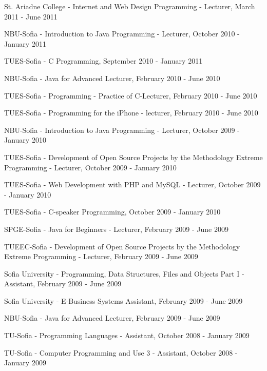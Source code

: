 \documentclass[english,a4paper]{europasscv}
\begin{document}
\begin{europasscv}
{\begin{ecvitemize}
    \item St. Ariadne College - Internet and Web Design Programming - Lecturer, March 2011 - June 2011
    \item NBU-Sofia - Introduction to Java Programming - Lecturer, October 2010 - January 2011
    \item TUES-Sofia - C Programming, September 2010 - January 2011
    \item NBU-Sofia - Java for Advanced Lecturer, February 2010 - June 2010
    \item TUES-Sofia - Programming - Practice of C-Lecturer, February 2010 - June 2010
    \item TUES-Sofia - Programming for the iPhone - lecturer, February 2010 - June 2010
    \item NBU-Sofia - Introduction to Java Programming - Lecturer, October 2009 - January 2010
    \item TUES-Sofia - Development of Open Source Projects by the Methodology Extreme Programming - Lecturer, October 2009 - January 2010
    \item TUES-Sofia - Web Development with PHP and MySQL - Lecturer, October 2009 - January 2010
    \item TUES-Sofia - C-speaker Programming, October 2009 - January 2010
    \item SPGE-Sofia - Java for Beginners - Lecturer, February 2009 - June 2009
    \item TUEEC-Sofia - Development of Open Source Projects by the Methodology Extreme Programming - Lecturer, February 2009 - June 2009
    \item Sofia University - Programming, Data Structures, Files and Objects Part I - Assistant, February 2009 - June 2009
    \item Sofia University - E-Business Systems Assistant, February 2009 - June 2009
    \item NBU-Sofia - Java for Advanced Lecturer, February 2009 - June 2009
    \item TU-Sofia - Programming Languages - Assistant, October 2008 - January 2009
    \item TU-Sofia - Computer Programming and Use 3 - Assistant, October 2008 - January 2009 
  \end{ecvitemize}}
  

\end{europasscv}
\end{document}
